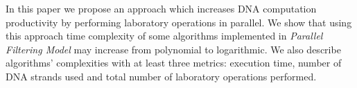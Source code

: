 In this paper we propose an approach which increases DNA computation productivity by performing laboratory operations in parallel. We show that using this approach time complexity of some algorithms implemented in \emph{Parallel Filtering Model} \cite{Amos:1996} may increase from polynomial to logarithmic. We also describe algorithms' complexities with at least three metrics: execution time, number of DNA strands used and total number of laboratory operations performed.